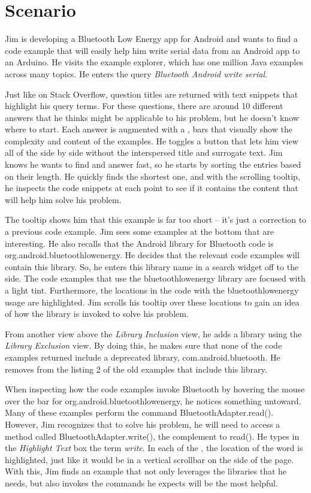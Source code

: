 \section{Scenario}

Jim is developing a Bluetooth Low Energy app for Android and wants to find a code example that will easily help him write serial data from an Android app to an Arduino.
He visits the \systemname{} example explorer, which has one million Java examples across many topics.
He enters the query \emph{Bluetooth Android write serial}.

Just like on Stack Overflow, question titles are returned with text snippets that highlight his query terms.
For these questions, there are around 10 different answers that he thinks might be applicable to his problem, but he doesn't know where to start.
Each answer is augmented with a \systemname{}, bars that visually show the complexity and content of the examples.
He toggles a button that lets him view all of the \systemname{} side by side without the interspersed title and surrogate text.
Jim knows he wants to find and answer fast, so he starts by sorting the \systemname{} entries based on their length.
He quickly finds the shortest one, and with the scrolling tooltip, he inspects the code snippets at each point to see if it contains the content that will help him solve his problem.

The tooltip shows him that this example is far too short -- it's just a correction to a previous code example.
Jim sees some examples at the bottom that are interesting.
He also recalls that the Android library for Bluetooth code is org.android.bluetoothlowenergy.
He decides that the relevant code examples will contain this library.
So, he enters this library name in a search widget off to the side.
The code examples that use the bluetoothlowenergy library are focused with a light tint.
Furthermore, the locations in the code with the bluetoothlowenergy usage are highlighted.
Jim scrolls his tooltip over these locations to gain an idea of how the library is invoked to solve his problem.

From another view above the \emph{Library Inclusion} view, he adds a library using the \emph{Library Exclusion} view.
By doing this, he makes sure that none of the code examples returned include a deprecated library, com.android.bluetooth.
He removes from the listing 2 of the old examples that include this library.

When inspecting how the code examples invoke Bluetooth by hovering the mouse over the bar for org.android.bluetoothlowenergy, he notices something untoward.
Many of these examples perform the command BluetoothAdapter.read().
However, Jim recognizes that to solve his problem, he will need to access a method called BluetoothAdapter.write(), the complement to read().
He types in the \emph{Highlight Text} box the term \emph{write}.
In each of the \systemname{}, the location of the word is highlighted, just like it would be in a vertical scrollbar on the side of the page.
With this, Jim finds an example that not only leverages the libraries that he needs, but also invokes the commands he expects will be the most helpful.

